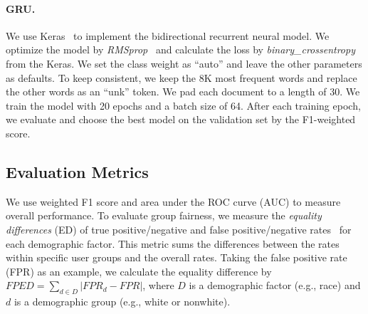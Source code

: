 \paragraph{GRU.} We use Keras~\cite{chollet2015keras} to implement the bidirectional recurrent neural model. 
We optimize the model by \textit{RMSprop}~\cite{tieleman2012lecture} and calculate the loss by \textit{binary\_crossentropy} from the Keras.
We set the class weight as ``auto'' and leave the other parameters as defaults.
To keep consistent, we keep the 8K most frequent words and replace the other words as an ``unk'' token.
We pad each document to a length of 30.
We train the model with 20 epochs and a batch size of 64. 
After each training epoch, we evaluate and choose the best model on the validation set by the F1-weighted score.


\subsection{Evaluation Metrics}

We use weighted F1 score and area under the ROC curve (AUC) to measure overall performance.
To evaluate {group fairness},
we measure the \textit{equality differences} (ED) of true positive/negative and false positive/negative rates~\cite{dixon2018measuring,park2018reducing,garg2019counterfactual} for each demographic factor. 
This metric sums the differences between the rates within specific user groups and the overall rates.
Taking the false positive rate (FPR) as an example, we calculate the equality difference by $FPED = \sum_{d \in D}|FPR_d - FPR|$, where $D$ is a demographic factor (e.g., race) and $d$ is a demographic group (e.g., white or nonwhite).


